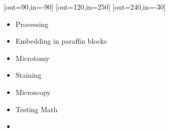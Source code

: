 \documentclass{article}
\begin{document}
[out=90,in=-90]
[out=120,in=250]
[out=240,in=-30]
\begin{itemize}
\item{}Processing 
\item{}Embedding in paraffin blocks
\item Microtomy
\item{}Staining
\item Microscopy 
\item Testing  \hfill Math 
\item
\end{itemize}
\end{document}
